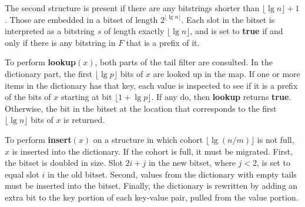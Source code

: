 \documentclass[11pt,letterpaper]{article}
\begin{document}
The second structure is present if there are any bitstrings shorter than $\lfloor \lg n \rfloor + 1$.
Those are embedded in a bitset of length $2^{\lfloor \lg n \rfloor}$.
Each slot in the bitset is interpreted as a bitstring $s$ of length exactly $\lfloor \lg n \rfloor$, and is set to {\bf true} if and only if there is any bitstring in $F$ that is a prefix of it.

To perform {\bf lookup$(x)$}, both parts of the tail filter are consulted.
In the dictionary part, the first $\lfloor \lg p \rfloor$ bits of $x$ are looked up in the map.
If one or more items in the dictionary has that key, each value is inspected to see if it is a prefix of the bits of $x$ starting at bit $\lfloor 1 + \lg p \rfloor$.
If any do, then {\bf lookup} returns {\bf true}.
Otherwise, the bit in the bitset at the location that corresponds to the first $\lfloor \lg n \rfloor$ bits of $x$ is returned.

To perform {\bf insert$(x)$} on a structure in which cohort $\lfloor \lg (n/m) \rfloor$ is not full, $x$ is inserted into the dictionary.
If the cohort is full, it must be migrated.
First, the bitset is doubled in size.
Slot $2i +j$ in the new bitset, where $j < 2$, is set to equal slot $i$ in the old bitset.
Second, values from the dictionary with empty tails must be inserted into the bitset.
Finally, the dictionary is rewritten by adding an extra bit to the key portion of each key-value pair, pulled from the value portion.




\end{document}
